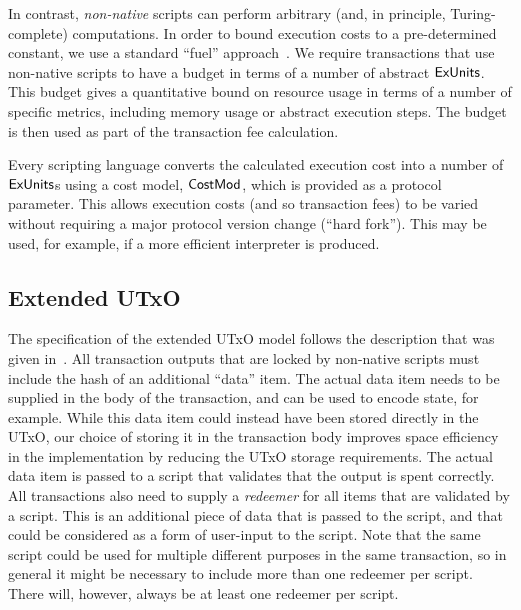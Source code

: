 In contrast, \emph{non-native} scripts can perform arbitrary
(and, in principle, Turing-complete) computations.
In order to bound execution costs to a pre-determined constant, we use a standard ``fuel'' approach~\cite{XX}.
We require transactions that use non-native scripts
to have a budget in terms of a number of abstract $\mathsf{ExUnits}$.
This budget gives a quantitative bound on resource usage in terms of a number of specific metrics, including memory usage or abstract execution steps.
The budget is then used as part of the transaction fee calculation.

Every scripting language
converts the calculated execution cost into a number of $\mathsf{ExUnits}$s using a cost model,
$\mathsf{CostMod}$, which is provided as a protocol parameter.
This allows execution costs (and so transaction fees) to be varied without requiring a major protocol version change (``hard fork'').
This may be used, for example, if a more efficient interpreter is produced.

\subsection{Extended UTxO}

The specification of the extended UTxO model follows the description that was given in~\cite{plutus_eutxo}.
All transaction outputs that are locked by non-native scripts must include the hash of an additional ``data'' item. The actual data item needs to be supplied in the body of the transaction, and can be used to encode state, for example.
While this data item could instead have been stored directly in the UTxO, our choice of storing it in the transaction body improves space efficiency in the implementation by reducing the UTxO storage requirements. The actual data item is passed to a script that validates that the output is spent correctly.
All transactions also need to supply a \emph{redeemer} for all items that are validated by a script. This is an additional piece of data that is passed to the script, and that could be considered as a form of user-input to the script. Note that the same script could be used for multiple different purposes in the same transaction, so in general it might be necessary to include more than one redeemer per script.
There will, however, always be at least one redeemer per script.
